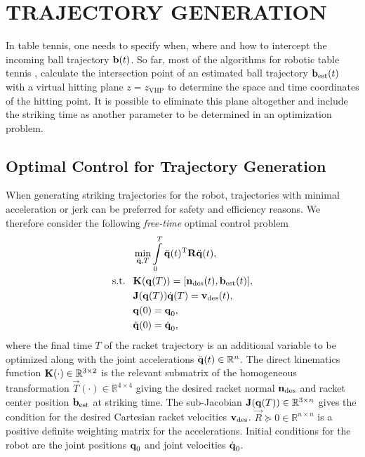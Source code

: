 \section{TRAJECTORY GENERATION}\label{method}

In table tennis, one needs to specify when, where and how to intercept the incoming ball trajectory $\boldsymbol{\mathrm{b}}(t)$. So far, most of the algorithms for robotic table tennis \cite{Matsushima05}, \cite{Muelling13} calculate the intersection point of an estimated ball trajectory $\boldsymbol{\mathrm{b}}_{\mathrm{est}}(t)$ with a virtual hitting plane $z = z_{\mathrm{VHP}}$ to determine the space and time coordinates of the hitting point. It is possible to eliminate this plane altogether and include the striking time as another parameter to be determined in an optimization problem.

\subsection{Optimal Control for Trajectory Generation}

When generating striking trajectories for the robot, trajectories with minimal acceleration or jerk can be preferred for safety and efficiency reasons. We therefore consider the following \emph{free-time} optimal control problem~\cite{Liberzon11}
%
\begin{align}
&\min_{\ddot{\boldsymbol{\mathrm{q}}},T} \int\limits_{0}^{T}\ddot{\boldsymbol{\mathrm{q}}}(t)^{\mathrm{T}}\boldsymbol{\mathrm{R}}\ddot{\boldsymbol{\mathrm{q}}}(t), \label{costFnc1} \\
\textrm{s.t. \ } & \boldsymbol{\mathrm{K}}(\boldsymbol{\mathrm{q}}(T)) = [\boldsymbol{\mathrm{n}}_{\mathrm{des}}(t),\boldsymbol{\mathrm{b}}_{\mathrm{est}}(t)], \label{transCond1}\\
&\boldsymbol{\mathrm{J}}(\boldsymbol{\mathrm{q}}(T))\dot{\boldsymbol{\mathrm{q}}}(T) = \boldsymbol{\mathrm{v}}_{\mathrm{des}}(t), \label{transCond2} \\
&\boldsymbol{\mathrm{q}}(0) = \boldsymbol{\mathrm{q}}_{0}, \label{initCond1} \\
&\dot{\boldsymbol{\mathrm{q}}}(0) = \dot{\boldsymbol{\mathrm{q}}}_{0}, \label{initCond2}
\end{align}
%
\noindent where the final time $T$ of the racket trajectory is an additional variable to be optimized along with the joint accelerations $\ddot{\boldsymbol{\mathrm{q}}}(t) \in \mathbb{R}^{n}$. The direct kinematics function $\boldsymbol{\mathrm{K}}(\cdot)  \in \mathbb{R}^{3 \times 2}$ is the relevant submatrix of the homogeneous transformation $\vec{T}(\cdot) \in \mathbb{R}^{4 \times 4}$ giving the desired racket normal $\boldsymbol{\mathrm{n}}_{\mathrm{des}}$ and racket center position $\boldsymbol{\mathrm{b}}_{\mathrm{est}}$ at striking time. The sub-Jacobian $\boldsymbol{\mathrm{J}}(\boldsymbol{\mathrm{q}}(T)) \in \mathbb{R}^{3 \times n}$ gives the condition for the desired Cartesian racket velocities $\boldsymbol{\mathrm{v}}_{\mathrm{des}}$. $\vec{R} \succeq 0 \in \mathbb{R}^{n \times n}$ is a positive definite weighting matrix for the accelerations. Initial conditions for the robot are the joint positions $\boldsymbol{\mathrm{q}}_0$ and joint velocities $\dot{\boldsymbol{\mathrm{q}}}_0$.


